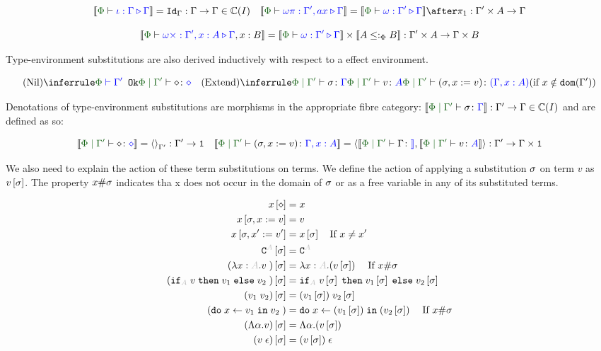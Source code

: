 \documentclass{Report}
\begin{document}
\[
    \deno{\pewrel{\i}{\G}{\G}} = \idg: \G \rightarrow \G \in \C(I)
    \quad
    \deno{\pewrel{\w\pi}{\G', ax}{\G}} = \deno{\pewrel{\w}{\G'}{\G}}\after\p: \G'\times A \rightarrow \G
\]

\[
    \deno{\pewrel{\w\x}{\G', x: A}{\G, x: B}} = \deno{\pewrel{\w}{\G'}{\G}}\times \deno{A\subtypep B}: \G'\times A \rightarrow \G\times B
\]

Type-environment substitutions are also derived inductively with respect to a effect environment.


\[
    \ntreeruleI{Nil}{\wellformedok{\P}{\G'}}{\etyperelation{\P}{\G'}{\nil}{\nil}}
    \quad
    \condtreeruleII{Extend}{
        \etyperelation{\P}{\G'}{\si}{\G}
    }{
        \etyperelation{\P}{\G'}{v}{A}
    }{
        \etyperelation{\P}{\G'}{(\si, x \setto v)}{(\gax)}
    }{x \notin \dom{\G'}}
\]

Denotations of type-environment substitutions are morphisms in the appropriate fibre category: $\deno{\etyperelation{\P}{\G'}{\si}{\G}}: \G' \rightarrow \G \in \C(I)$ and are defined as so:

\[
    \deno{\etyperelation{\P}{\G'}{\nil}{\nil}} = \term{\G'}: \G' \rightarrow \1
    \quad
    \deno{\etyperelation{\P}{\G'}{(\si, x \setto v)}{\gax}} = \pr{\deno{\etyperelation{\P}{\G'}{\G}}}{\deno{\etyperelation{\P}{\G'}{v}{A}}}: \G' \rightarrow \G\times \1
\]

We also need to explain the action of these term substitutions on terms. We define the action of applying a substitution $\sigma$  on term $v$ as $v\left[\sigma\right]$. The property $x\#\sigma$ indicates tha x does not occur in the domain of $\sigma$ or as a free variable in any of its substituted terms.

\begin{align*}
    x\sub{\nil} & = x \\
    x\sub{\si,x\setto v} & = v \\
    x\sub{\si,x'\setto v'} & = x\ssi\qt{If }x \neq x'\\
    \const{A}\ssi & = \const{A} \\
    (\lam{x}{A}{v})\ssi &= \lam{x}{A}{(v\ssi)}\qt{If }x\#\si\\
    (\pifthenelse{A}{v}{v_1}{v_2})\ssi &= \pifthenelse{A}{v\ssi}{v_1\ssi}{v_2\ssi}\\
    (\apply{v_1}{v_2})\ssi&= \apply{(v_1\ssi)}{v_2\ssi}\\
    (\doin{x}{v_1}{v_2})&= \doin{x}{(v_1\ssi)}{(v_2\ssi)}\qt{If } x\#\si\\
    (\elam{\a}{v})\ssi & = \elam{\a}{(v\ssi)}\\
    (\eapp{v}{\e})\ssi & = \eapp{(v\ssi)}{\e}\\
\end{align*}
\end{document}
